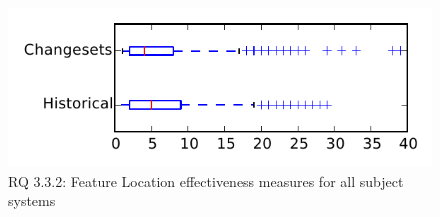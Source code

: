 
\begin{figure}
\centering
\includegraphics[height=0.4\textheight]{figures/flt/rq2_tiny}
\caption{RQ 3.3.2: Feature Location effectiveness measures for all subject systems}
\label{fig:flt:rq2:tiny}
\end{figure}
